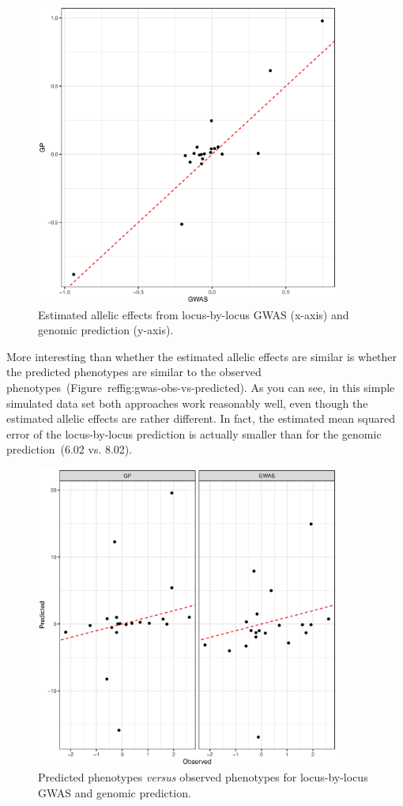 \begin{figure}
  \begin{center}
    \includegraphics[width=10cm]{gwas-vs-gp.eps}
  \end{center}
  \caption{Estimated allelic effects from locus-by-locus GWAS (x-axis)
    and genomic prediction (y-axis).}\label{fig:gwas-vs-gp}
\end{figure}

More interesting than whether the estimated allelic effects are
similar is whether the predicted phenotypes are similar to the
observed phenotypes~(Figure~ref{fig:gwas-obs-vs-predicted}). As you
can see, in this simple simulated data set both approaches work
reasonably well, even though the estimated allelic effects are rather
different. In fact, the estimated mean squared error of the
locus-by-locus prediction is actually smaller than for the genomic
prediction~(6.02 vs. 8.02).

\begin{figure}
  \begin{center}
    \includegraphics[width=10cm]{gwas-obs-vs-predicted.eps}
  \end{center}
  \caption{Predicted phenotypes {\it versus\/} observed phenotypes for
    locus-by-locus GWAS and genomic prediction.}\label{fig:gwas-obs-vs-predicted}
\end{figure}

